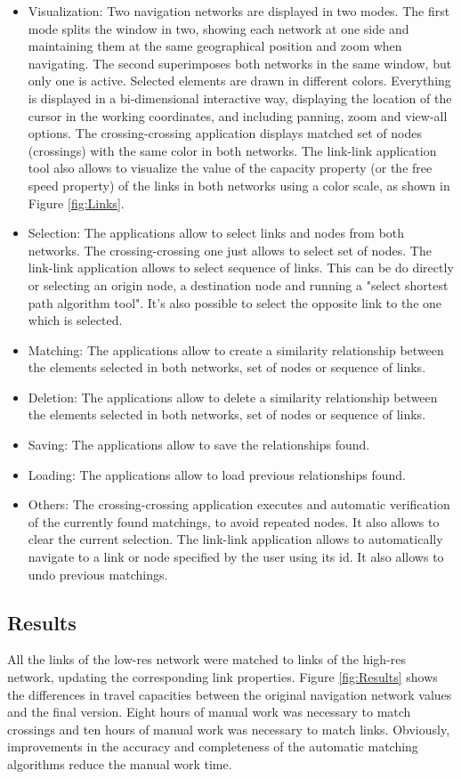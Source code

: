 \begin{itemize}
\item Visualization: Two navigation networks are displayed in two modes. The first mode splits the window in two, showing each network at one side and maintaining them at the same geographical position and zoom when navigating. The second superimposes both networks in the same window, but only one is active. Selected elements are drawn in different colors. Everything is displayed in a bi-dimensional interactive way, displaying the location of the cursor in the working coordinates, and including panning, zoom and view-all options. The crossing-crossing application displays matched set of nodes (crossings) with the same color in both networks. The link-link application tool also allows to visualize the value of the capacity property (or the free speed property) of the links in both networks using a color scale, as shown in Figure \ref{fig:Links}.
\item Selection: The applications allow to select links and nodes from both networks. The crossing-crossing one just allows to select set of nodes. The link-link application allows to select sequence of links. This can be do directly or selecting an origin node, a destination node and running a "select shortest path algorithm tool". It's also possible to select the opposite link to the one which is selected.
\item Matching: The applications allow to create a similarity relationship between the elements selected in both networks, set of nodes or sequence of links.
\item Deletion: The applications allow to delete a similarity relationship between the elements selected in both networks, set of nodes or sequence of links.
\item Saving: The applications allow to save the relationships found.
\item Loading: The applications allow to load previous relationships found.
\item Others: The crossing-crossing application executes and automatic verification of the currently found matchings, to avoid repeated nodes. It also allows to clear the current selection. The link-link application allows to automatically navigate to a link or node specified by the user using its id. It also allows to undo previous matchings. 
\end{itemize}

\subsection{Results}
All the links of the low-res network were matched to links of the high-res network, updating the corresponding link properties. Figure \ref{fig:Results} shows the differences in travel capacities between the original navigation network values and the final version. Eight hours of manual work was necessary to match crossings and ten hours of manual work was necessary to match links. Obviously, improvements in the accuracy and completeness of the automatic matching algorithms reduce the manual work time.

